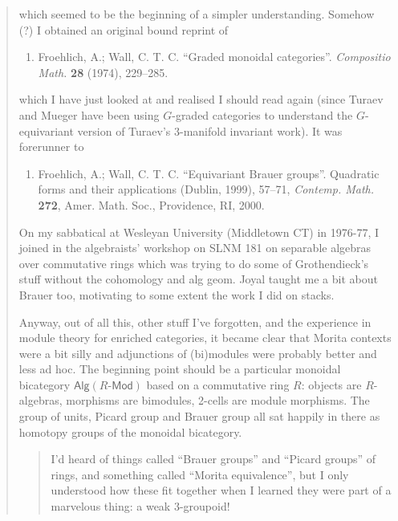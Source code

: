 \documentclass{article}
\def\tightlist{}
\begin{document}
\begin{quote}
which seemed to be the beginning of a simpler understanding. Somehow (?)
I obtained an original bound reprint of

\begin{enumerate}
\def\labelenumi{\arabic{enumi})}
\setcounter{enumi}{37}
\tightlist
\item
  Froehlich, A.; Wall, C. T. C. ``Graded monoidal categories''.
  \emph{Compositio Math.} \textbf{28} (1974), 229--285.
\end{enumerate}

which I have just looked at and realised I should read again (since
Turaev and Mueger have been using \(G\)-graded categories to understand
the \(G\)-equivariant version of Turaev's \(3\)-manifold invariant
work). It was forerunner to

\begin{enumerate}
\def\labelenumi{\arabic{enumi})}
\setcounter{enumi}{38}
\tightlist
\item
  Froehlich, A.; Wall, C. T. C. ``Equivariant Brauer groups''. Quadratic
  forms and their applications (Dublin, 1999), 57--71, \emph{Contemp.
  Math.} \textbf{272}, Amer. Math. Soc., Providence, RI, 2000.
\end{enumerate}

On my sabbatical at Wesleyan University (Middletown CT) in 1976-77, I
joined in the algebraists' workshop on SLNM 181 on separable algebras
over commutative rings which was trying to do some of Grothendieck's
stuff without the cohomology and alg geom. Joyal taught me a bit about
Brauer too, motivating to some extent the work I did on stacks.

Anyway, out of all this, other stuff I've forgotten, and the experience
in module theory for enriched categories, it became clear that Morita
contexts were a bit silly and adjunctions of (bi)modules were probably
better and less ad hoc. The beginning point should be a particular
monoidal bicategory \(\mathsf{Alg}(R\mbox{-}\mathsf{Mod})\) based on a
commutative ring \(R\): objects are \(R\)-algebras, morphisms are
bimodules, 2-cells are module morphisms. The group of units, Picard
group and Brauer group all sat happily in there as homotopy groups of
the monoidal bicategory.

\begin{quote}
I'd heard of things called ``Brauer groups'' and ``Picard groups'' of
rings, and something called ``Morita equivalence'', but I only
understood how these fit together when I learned they were part of a
marvelous thing: a weak \(3\)-groupoid!
\end{quote}


\end{quote}
\end{document}
